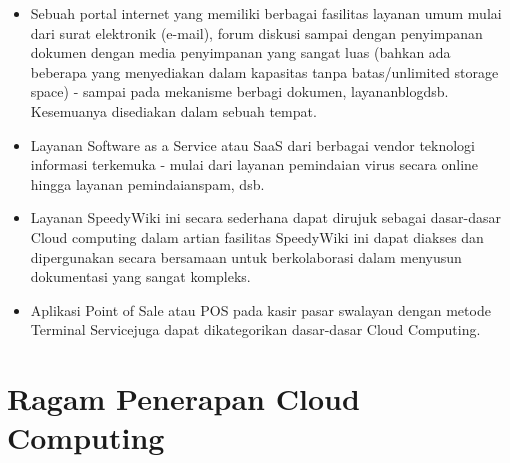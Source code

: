 \begin{itemize}
\item Sebuah portal internet yang memiliki berbagai fasilitas layanan umum mulai dari surat elektronik (e-mail), forum diskusi sampai dengan penyimpanan dokumen dengan media penyimpanan yang sangat luas (bahkan ada beberapa yang menyediakan dalam kapasitas tanpa batas/unlimited storage space) - sampai pada mekanisme berbagi dokumen, layananblogdsb. Kesemuanya disediakan dalam sebuah tempat.
\item Layanan Software as a Service atau SaaS dari berbagai vendor teknologi informasi terkemuka - mulai dari layanan pemindaian virus secara online hingga layanan pemindaianspam, dsb.
\item Layanan SpeedyWiki ini secara sederhana dapat dirujuk sebagai dasar-dasar Cloud computing dalam artian fasilitas SpeedyWiki ini dapat diakses dan dipergunakan secara bersamaan untuk berkolaborasi dalam menyusun dokumentasi yang sangat kompleks.
\item Aplikasi Point of Sale atau POS pada kasir pasar swalayan dengan metode Terminal Servicejuga dapat dikategorikan dasar-dasar Cloud Computing.
\end{itemize}
\section{Ragam Penerapan Cloud Computing}
